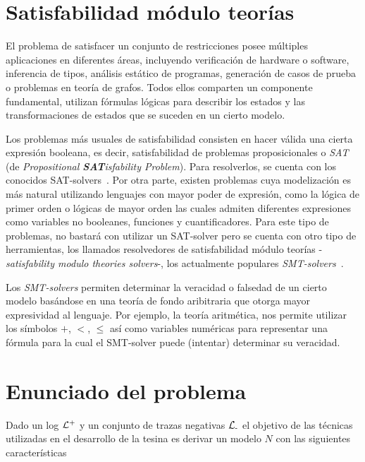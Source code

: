 \section{Satisfabilidad módulo teorías}
\label{sec:2.smt}

El problema de satisfacer un conjunto de restricciones posee múltiples aplicaciones
en diferentes áreas, incluyendo verificación de hardware o software, inferencia de 
tipos, análisis estático de programas, generación de casos de prueba o problemas en
teoría de grafos. Todos ellos comparten un componente fundamental, utilizan fórmulas
lógicas para describir los estados y las transformaciones de estados que se suceden
en un cierto modelo.

Los problemas más usuales de satisfabilidad consisten en hacer válida una cierta 
expresión booleana, es decir, satisfabilidad de problemas proposicionales 
o \textit{SAT} (de \textit{Propositional \textbf{SAT}isfability Problem}). Para resolverlos,
se cuenta con los conocidos SAT-solvers~\cite{barrettSMT2009}.
Por otra parte, existen problemas cuya modelización es más natural utilizando lenguajes con
mayor poder de expresión, como la lógica de primer orden o lógicas de mayor orden las cuales
admiten diferentes expresiones como variables no booleanes, funciones y cuantificadores.
Para este tipo de problemas, no bastará con utilizar un SAT-solver pero se cuenta con
otro tipo de herramientas, los llamados resolvedores de satisfabilidad módulo teorías
-\textit{satisfability modulo theories solvers}-, los actualmente populares \textit{SMT-solvers}~\cite{deMoura2009}.

Los \textit{SMT-solvers} permiten determinar la veracidad o falsedad de un cierto modelo
basándose en una teoría de fondo aribitraria que otorga mayor expresividad al lenguaje.
Por ejemplo, la teoría aritmética, nos permite utilizar los símbolos  $+$, $<$, $\leq$ 
así como variables numéricas para representar una fórmula para la cual 
el SMT-solver puede (intentar) determinar su veracidad.

\section{Enunciado del problema} 
\label{sec:2.problem}

Dado un log ${\mathcal L}\textsuperscript{+}$ y un conjunto de trazas negativas ${\mathcal L}\textsubscript{-}$ el objetivo de las técnicas utilizadas
en el desarrollo de la tesina es derivar un modelo $N$ con las siguientes características\\

